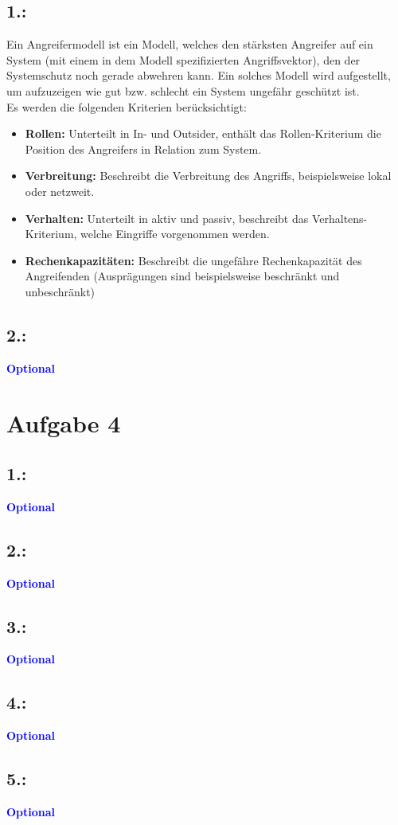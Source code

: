 \documentclass[a4paper,11pt]{scrartcl}
\newcommand{\opt}{\textcolor{blue}{\textbf{Optional}}}
\begin{document}
	\subsection*{1.:}
	Ein Angreifermodell ist ein Modell, welches den stärksten Angreifer auf ein System (mit einem in dem 
	Modell spezifizierten Angriffsvektor), den der Systemschutz noch gerade abwehren kann. Ein solches Modell 
	wird aufgestellt, um aufzuzeigen wie gut bzw. schlecht ein System ungefähr geschützt ist. \\
	Es werden die folgenden Kriterien berücksichtigt: \\
	\begin{itemize}
		\item \textbf{Rollen:} 
		Unterteilt in In- und Outsider, enthält das Rollen-Kriterium die Position des Angreifers in Relation zum
		System. \\
		\item \textbf{Verbreitung:} 
		Beschreibt die Verbreitung des Angriffs, beispielsweise lokal oder netzweit. \\ 
		\item \textbf{Verhalten:} 
		Unterteilt in aktiv und passiv, beschreibt das Verhaltens-Kriterium, welche Eingriffe vorgenommen werden.\\
		\item \textbf{Rechenkapazitäten:} 
		Beschreibt die ungefähre Rechenkapazität des Angreifenden (Ausprägungen sind beispielsweise beschränkt 
		und unbeschränkt)
	\end{itemize}		
	
   	\subsection*{2.:}
	\opt


\section*{Aufgabe 4}
	\subsection*{1.:}
	\opt
	\subsection*{2.:}
	\opt
	\subsection*{3.:}
	\opt
	\subsection*{4.:}
	\opt
	\subsection*{5.:}
	\opt
\end{document}
